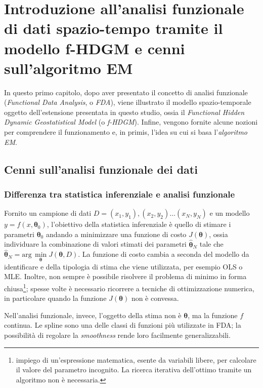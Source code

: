 \chapter[Il modello f-HDGM e l'algoritmo EM]{Introduzione all'analisi funzionale di dati spazio-tempo tramite il modello f-HDGM e cenni sull'algoritmo EM}

In questo primo capitolo, dopo aver presentato il concetto di analisi funzionale (\textit{Functional Data Analysis}, o \textit{FDA}), viene illustrato il modello spazio-temporale oggetto dell'estensione presentata in questo studio, ossia il \textit{Functional Hidden Dynamic Geostatistical Model} (o \textit{f-HDGM}). Infine, vengono fornite alcune nozioni per comprendere il funzionamento e, in primis, l'idea su cui si basa l'\textit{algoritmo EM}.

\section[Cenni sull'analisi funzionale dei dati]{Cenni sull'analisi funzionale dei dati}

\subsection[Differenza tra statistica inferenziale e analisi funzionale]{Differenza tra statistica inferenziale e analisi funzionale}
Fornito un campione di dati $D = (x_1, y_1), (x_2, y_2)\dots (x_N, y_N)$ e un modello $y = f(x, \boldsymbol{\theta}_0)$, l'obiettivo della statistica inferenziale è quello di stimare i parametri $\boldsymbol{\theta}_0$ andando a minimizzare una funzione di costo $J(\boldsymbol{\theta})$, ossia individuare la combinazione di valori stimati dei parametri $\boldsymbol{\hat{\theta}}_N$ tale che $\boldsymbol{\hat{\theta}}_N = \text{arg}\,\min\limits_{\boldsymbol{\theta}} J(\boldsymbol{\theta}, D)$. La funzione di costo cambia a seconda del modello da identificare e della tipologia di stima che viene utilizzata, per esempio OLS o MLE. Inoltre, non sempre è possibile risolvere il problema di minimo in forma chiusa\footnote{impiego di un'espressione matematica, esente da variabili libere, per calcolare il valore del parametro incognito. La ricerca iterativa dell'ottimo tramite un algoritmo non è necessaria.}; spesse volte è necessario ricorrere a tecniche di ottimizzazione numerica, in particolare quando la funzione $J(\boldsymbol{\theta})$ non è convessa. \par Nell'analisi funzionale, invece, l'oggetto della stima non è $\boldsymbol{\theta}$, ma la funzione $f$ continua. Le spline sono una delle classi di funzioni più utilizzate in FDA; la possibilità di regolare  la \textit{smoothness} rende loro facilmente generalizzabili.

